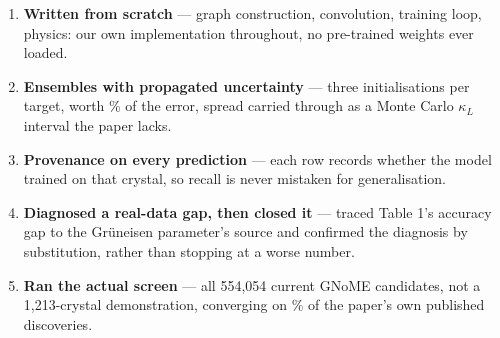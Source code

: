 \documentclass[aspectratio=169]{beamer}
\begin{document}
\begin{frame}

\sffamily\footnotesize
\begin{enumerate}
\setlength\itemsep{3pt}
\item \textbf{Written from scratch} --- graph construction, convolution,
  training loop, physics: our own implementation throughout, no
  pre-trained weights ever loaded.
\item \textbf{Ensembles with propagated uncertainty} --- three
  initialisations per target, worth \EnsembleGainPct\% of the error, spread
  carried through as a Monte Carlo $\kappa_L$ interval the paper lacks.
\item \textbf{Provenance on every prediction} --- each row records whether
  the model trained on that crystal, so recall is never mistaken for
  generalisation.
\item \textbf{Diagnosed a real-data gap, then closed it} --- traced Table
  1's accuracy gap to the Gr\"uneisen parameter's source and confirmed the
  diagnosis by substitution, rather than stopping at a worse number.
\item \textbf{Ran the actual screen} --- all 554{,}054 current GNoME
  candidates, not a 1{,}213-crystal demonstration, converging on
  \GnPctOfPaper\% of the paper's own published discoveries.
\end{enumerate}

\end{frame}
\end{document}
